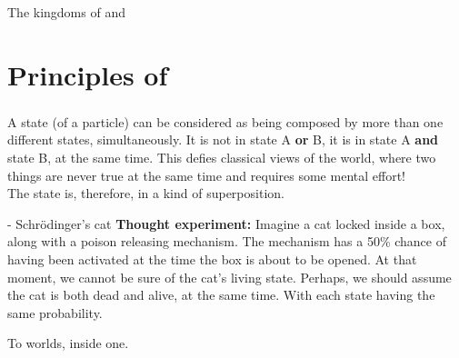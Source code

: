 \documentclass[aspectratio=43]{beamer}
\begin{document}
\begin{frame}{The kingdoms of \cl and \qm}
\begin{card}
    \centering{}
\end{card}
\pagenumber
\end{frame}

\section{Principles of \qm}
\subsubsection{\qsp}
\begin{frame}{\qsp}
    \begin{card}
        A \q state (of a particle) can be considered as being composed by more than one different states, simultaneously. It is not in state A \textbf{or} B, it is in state A \textbf{and} state B, at the same time. This defies classical views of the world, where two things are never true at the same time and requires some mental effort!\\
        The state is, therefore, in a kind of superposition.
    \end{card}
\pagenumber
\end{frame}

\begin{frame}{\qsp - Schrödinger's cat}
    \textbf{Thought experiment:} Imagine a cat locked inside a box, along with a poison releasing mechanism. The mechanism has a 50\% chance of having been activated at the time the box is about to be opened. At that moment, we cannot be sure of the cat's living state. Perhaps, we should assume the cat is both dead and alive, at the same time. With each state having the same probability.
    \begin{center}
    \end{center}
    \begin{center}
        To worlds, inside one.
    \end{center}
\pagenumber
\end{frame}
\end{document}
